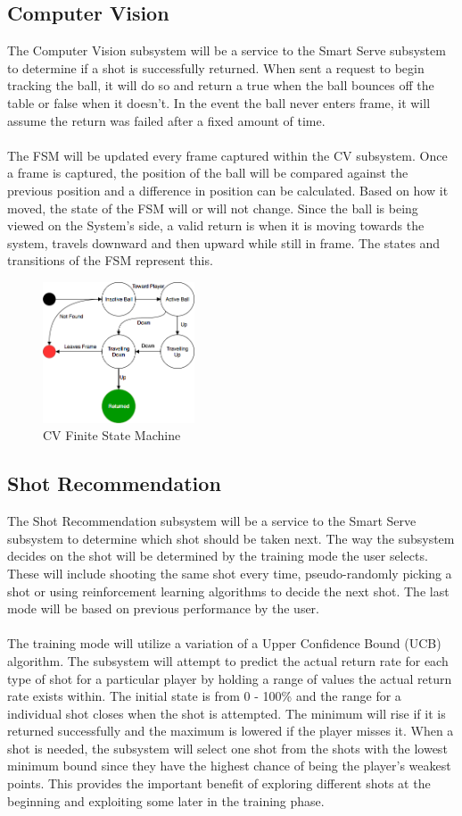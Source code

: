 \documentclass[11pt]{article}
\begin{document}
\subsection{Computer Vision}
The Computer Vision subsystem will be a service to the Smart Serve subsystem to determine if a shot is successfully returned. When sent a request to begin tracking the ball, it will do so and return a true when the ball bounces off the table or false when it doesn't. In the event the ball never enters frame, it will assume the return was failed after a fixed amount of time. \\ \\
The FSM will be updated every frame captured within the CV subsystem. Once a frame is captured, the position of the ball will be compared against the previous position and a difference in position can be calculated. Based on how it moved, the state of the FSM will or will not change. Since the ball is being viewed on the System's side, a valid return is when it is moving towards the system, travels downward and then upward while still in frame. The states and transitions of the FSM represent this.
\begin{figure}[H]
   \centering
   \includegraphics[width=0.4\textwidth]{img/cvFSM.png}
   \caption{CV Finite State Machine}
   \label{fig:cv}
\end{figure}
\subsection{Shot Recommendation}
The Shot Recommendation subsystem will be a service to the Smart Serve subsystem to determine which shot should be taken next. The way the subsystem decides on the shot will be determined by the training mode the user selects. These will include shooting the same shot every time, pseudo-randomly picking a shot or using reinforcement learning algorithms to decide the next shot. The last mode will be based on previous performance by the user. \\ \\
The training mode will utilize a variation of a Upper Confidence Bound (UCB) algorithm. The subsystem will attempt to predict the actual return rate for each type of shot for a particular player by holding a range of values the actual return rate exists within. The initial state is from 0 - 100\% and the range for a individual shot closes when the shot is attempted. The minimum will rise if it is returned successfully and the maximum is lowered if the player misses it. When a shot is needed, the subsystem will select one shot from the shots with the lowest minimum bound since they have the highest chance of being the player's weakest points. This provides the important benefit of exploring different shots at the beginning and exploiting some later in the training phase. 
\end{document}
